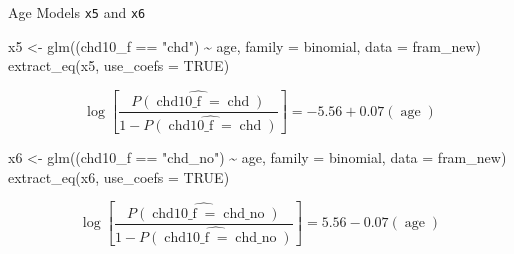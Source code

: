 \documentclass[
  ignorenonframetext,
]{beamer}
\newenvironment{Shaded}{\begin{snugshade}}{\end{snugshade}}
\newcommand{\AttributeTok}[1]{\textcolor[rgb]{0.77,0.63,0.00}{#1}}
\newcommand{\ConstantTok}[1]{\textcolor[rgb]{0.00,0.00,0.00}{#1}}
\newcommand{\FunctionTok}[1]{\textcolor[rgb]{0.00,0.00,0.00}{#1}}
\newcommand{\NormalTok}[1]{#1}
\newcommand{\OtherTok}[1]{\textcolor[rgb]{0.56,0.35,0.01}{#1}}
\newcommand{\SpecialCharTok}[1]{\textcolor[rgb]{0.00,0.00,0.00}{#1}}
\newcommand{\StringTok}[1]{\textcolor[rgb]{0.31,0.60,0.02}{#1}}
\begin{document}
\begin{frame}[fragile]{Age Models \texttt{x5} and \texttt{x6}}
\protect\hypertarget{age-models-x5-and-x6}{}
\begin{Shaded}
\begin{Highlighting}[]
\NormalTok{x5 }\OtherTok{\textless{}{-}} \FunctionTok{glm}\NormalTok{((chd10\_f }\SpecialCharTok{==} \StringTok{"chd"}\NormalTok{) }\SpecialCharTok{\textasciitilde{}}\NormalTok{ age, }
          \AttributeTok{family =}\NormalTok{ binomial, }\AttributeTok{data =}\NormalTok{ fram\_new)}
\FunctionTok{extract\_eq}\NormalTok{(x5, }\AttributeTok{use\_coefs =} \ConstantTok{TRUE}\NormalTok{)}
\end{Highlighting}
\end{Shaded}

\begin{equation}
\log\left[ \frac { \widehat{P( \operatorname{chd10\_f} = \operatorname{chd} )} }{ 1 - \widehat{P( \operatorname{chd10\_f} = \operatorname{chd} )} } \right] = -5.56 + 0.07(\operatorname{age})
\end{equation}

\begin{Shaded}
\begin{Highlighting}[]
\NormalTok{x6 }\OtherTok{\textless{}{-}} \FunctionTok{glm}\NormalTok{((chd10\_f }\SpecialCharTok{==} \StringTok{"chd\_no"}\NormalTok{) }\SpecialCharTok{\textasciitilde{}}\NormalTok{ age, }
          \AttributeTok{family =}\NormalTok{ binomial, }\AttributeTok{data =}\NormalTok{ fram\_new)}
\FunctionTok{extract\_eq}\NormalTok{(x6, }\AttributeTok{use\_coefs =} \ConstantTok{TRUE}\NormalTok{)}
\end{Highlighting}
\end{Shaded}

\begin{equation}
\log\left[ \frac { \widehat{P( \operatorname{chd10\_f} = \operatorname{chd\_no} )} }{ 1 - \widehat{P( \operatorname{chd10\_f} = \operatorname{chd\_no} )} } \right] = 5.56 - 0.07(\operatorname{age})
\end{equation}
\end{frame}
\end{document}
